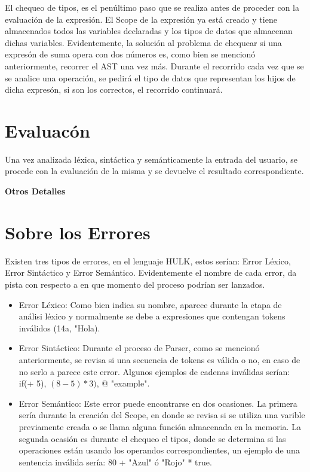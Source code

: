 \documentclass[10pt,a4paper]{article}
\begin{document}
El chequeo de tipos, es el pen\'ultimo paso que se realiza antes de proceder con la evaluaci\'on de la expresi\'on. El Scope de la expresi\'on ya est\'a creado y tiene almacenados todos las variables declaradas y los tipos de datos que almacenan dichas variables. Evidentemente, la soluci\'on al problema de chequear si una expres\'on de suma opera con dos n\'umeros es, como bien se mencion\'o anteriormente, recorrer el AST una vez m\'as. Durante el recorrido cada vez que se se analice una operaci\'on, se pedir\'a el tipo de datos que representan los hijos de dicha expres\'on, si son los correctos, el recorrido continuar\'a.\\

\section{Evaluac\'on}
Una vez analizada l\'exica, sint\'actica y sem\'anticamente la entrada del usuario, se procede con la evaluaci\'on de la misma y se devuelve el resultado correspondiente.

\begin{center}
\textbf{Otros Detalles}
\end{center}

\section*{Sobre los Errores}
Existen tres tipos de errores, en el lenguaje HULK, estos ser\'ian: Error L\'exico, Error Sint\'actico y Error Sem\'antico. Evidentemente el nombre de cada error, da pista con respecto a en que momento del proceso podr\'ian ser lanzados.
\begin{itemize}
\item Error L\'exico: Como bien indica su nombre, aparece durante la etapa de an\'alisi l\'exico y normalmente se debe a expresiones que contengan tokens inv\'alidos (14a, "Hola).
\item Error Sint\'actico: Durante el proceso de Parser, como se mencion\'o anteriormente, se revisa si una secuencia de tokens es v\'alida o no, en caso de no serlo a parece este error. Algunos ejemplos de cadenas inv\'alidas ser\'ian: if(+ 5), $(8 - 5) * 3)$, @ "example".
\item Error Sem\'antico: Este error puede encontrarse en dos ocasiones. La primera ser\'ia durante la creaci\'on del Scope, en donde se revisa si se utiliza una varible previamente creada o se llama alguna funci\'on almacenada en la memoria. La segunda ocasi\'on es durante el chequeo el tipos, donde se determina si las operaciones est\'an usando los operandos correspondientes, un ejemplo de una sentencia inv\'alida ser\'ia: 80 + "Azul" \'o "Rojo" * true.\\
\end{itemize}
\end{document}

